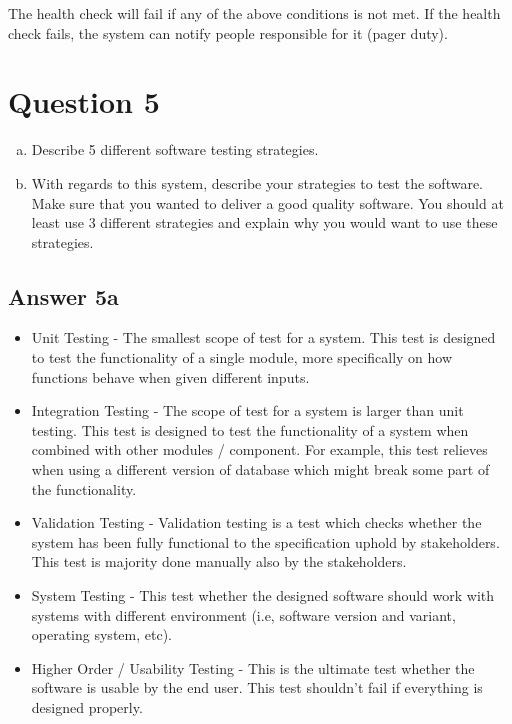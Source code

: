 \documentclass[
  11pt, %
]{assignment}
\begin{document}
The health check will fail if any of the above conditions is not met. If the health check fails, the system can notify people responsible for it (pager duty).

\section*{Question 5}
\begin{problem}
\begin{enumerate}[a.]
  \item Describe 5 different software testing strategies.
  \item With regards to this system, describe your strategies to test the software. Make sure that you wanted to deliver a good quality software. You should at least use 3 different strategies and explain why you would want to use these strategies.
\end{enumerate}
\end{problem}

\subsection*{Answer 5a}

\begin{itemize}
  \item Unit Testing - The smallest scope of test for a system. This test is designed to test the functionality of a single module, more specifically on how functions behave when given different inputs.
  \item Integration Testing - The scope of test for a system is larger than unit testing. This test is designed to test the functionality of a system when combined with other modules / component. For example, this test relieves when using a different version of database which might break some part of the functionality.
  \item Validation Testing - Validation testing is a test which checks whether the system has been fully functional to the specification uphold by stakeholders. This test is majority done manually also by the stakeholders.
  \item System Testing - This test whether the designed software should work with systems with different environment (i.e, software version and variant, operating system, etc).
  \item Higher Order / Usability Testing - This is the ultimate test whether the software is usable by the end user. This test shouldn't fail if everything is designed properly.
\end{itemize}
\end{document}

